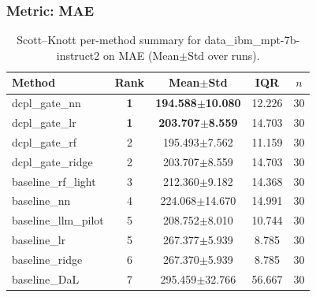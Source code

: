\subsubsection*{Metric: MAE}
\begin{table}[H]
\centering
\scriptsize
\setlength{\tabcolsep}{4pt}
\renewcommand{\arraystretch}{1.1}
\caption{Scott--Knott per-method summary for data\_ibm\_mpt-7b-instruct2 on MAE (Mean$\pm$Std over runs).}
\label{tab:sk_data_ibm_mpt-7b-instruct2_MAE}
\begin{tabular}{l|c|c|c|c}
\hline
\textbf{Method} & \textbf{Rank} & \textbf{Mean$\pm$Std} & \textbf{IQR} & \textbf{$n$} \\
\hline
\rowcolor{red!15} dcpl\_gate\_nn & \textbf{1} & \textbf{194.588$\pm$10.080} & 12.226 & 30 \\
\rowcolor{red!15} dcpl\_gate\_lr & \textbf{1} & \textbf{203.707$\pm$8.559} & 14.703 & 30 \\
dcpl\_gate\_rf & 2 & 195.493$\pm$7.562 & 11.159 & 30 \\
dcpl\_gate\_ridge & 2 & 203.707$\pm$8.559 & 14.703 & 30 \\
baseline\_rf\_light & 3 & 212.360$\pm$9.182 & 14.368 & 30 \\
baseline\_nn & 4 & 224.068$\pm$14.670 & 14.991 & 30 \\
baseline\_llm\_pilot & 5 & 208.752$\pm$8.010 & 10.744 & 30 \\
baseline\_lr & 5 & 267.377$\pm$5.939 & 8.785 & 30 \\
baseline\_ridge & 6 & 267.370$\pm$5.939 & 8.785 & 30 \\
baseline\_DaL & 7 & 295.459$\pm$32.766 & 56.667 & 30 \\
\hline
\end{tabular}
\end{table}

